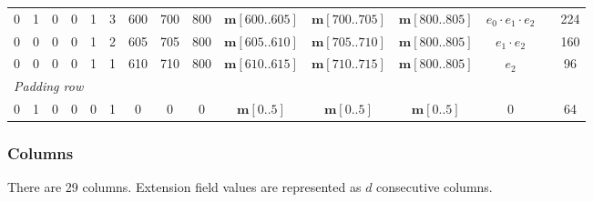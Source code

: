\documentclass{article}
\theoremstyle{definition}
\newcommand{\extdeg}{d} %
\begin{document}
{\begin{tabular}{ccccccccccccccc}
0 & 1 & 0 & 0 & 1 & 3 & 600 & 700 & 800 & $\textbf{m}[600..605]$ & $\textbf{m}[700..705]$ & $\textbf{m}[800..805]$ & $e_0 \cdot e_1 \cdot e_2$ & & 224 \\
0 & 0 & 0 & 0 & 1 & 2 & 605 & 705 & 800 & $\textbf{m}[605..610]$ & $\textbf{m}[705..710]$ & $\textbf{m}[800..805]$ & $e_1 \cdot e_2$           & & 160 \\
0 & 0 & 0 & 0 & 1 & 1 & 610 & 710 & 800 & $\textbf{m}[610..615]$ & $\textbf{m}[710..715]$ & $\textbf{m}[800..805]$ & $e_2$                     & & 96 \\
\midrule
\multicolumn{15}{l}{\textit{Padding row}} \\[2pt]
0 & 1 & 0 & 0 & 0 & 1 & 0   & 0   & 0   & $\textbf{m}[0..5]$ & $\textbf{m}[0..5]$ & $\textbf{m}[0..5]$ & 0 & & 64 \\
\bottomrule
\end{tabular}%
}

\subsubsection{Columns}

There are 29 columns. Extension field values are represented as $\extdeg$ consecutive columns.

\vspace{2mm}
\end{document}
